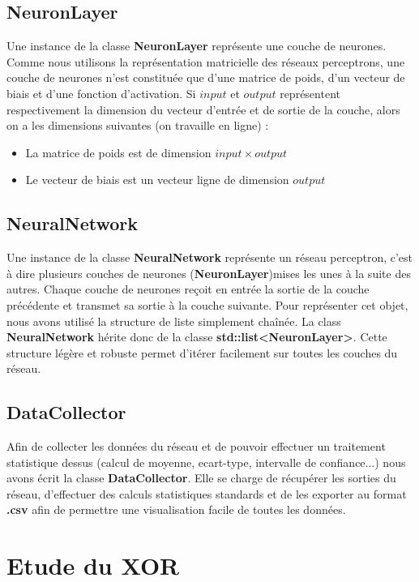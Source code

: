 \subsection{NeuronLayer}

Une instance de la classe \textbf{NeuronLayer} représente une couche de neurones. Comme nous utilisons la représentation matricielle des réseaux perceptrons, une couche de neurones n'est constituée que d'une matrice de poids, d'un vecteur de biais et d'une fonction d'activation. Si $input$ et $output$ représentent respectivement la dimension du vecteur d'entrée et de sortie de la couche, alors on a les dimensions suivantes (on travaille en ligne) :
\begin{itemize}
	\item La matrice de poids est de dimension $input \times output$
	\item Le vecteur de biais est un vecteur ligne de dimension $output$
\end{itemize}

\subsection{NeuralNetwork}

Une instance de la classe \textbf{NeuralNetwork} représente un réseau perceptron, c'est à dire plusieurs couches de neurones (\textbf{NeuronLayer})mises les unes à la suite des autres. Chaque couche de neurones reçoit en entrée la sortie de la couche précédente et transmet sa sortie à la couche suivante. 
Pour représenter cet objet, nous avons utilisé la structure de liste simplement chaînée. La class \textbf{NeuralNetwork} hérite donc de la classe \textbf{std::list<NeuronLayer>}. Cette structure légère et robuste permet d'itérer facilement sur toutes les couches du réseau. 

\subsection{DataCollector}

Afin de collecter les données du réseau et de pouvoir effectuer un traitement statistique dessus (calcul de moyenne, ecart-type, intervalle de confiance...) nous avons écrit la classe \textbf{DataCollector}. Elle se charge de récupérer les sorties du réseau, d'effectuer des calculs statistiques standards et de les exporter au format \textbf{.csv} afin de permettre une visualisation facile de toutes les données.

\section{Etude du XOR}

